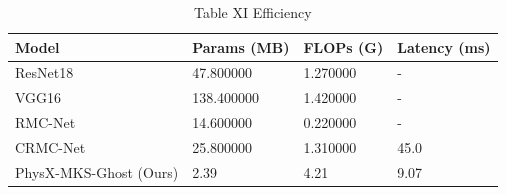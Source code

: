 \begin{table}
\caption{Table XI Efficiency}
\begin{tabular}{llll}
\toprule
Model & Params (MB) & FLOPs (G) & Latency (ms) \\
\midrule
ResNet18 & 47.800000 & 1.270000 & - \\
VGG16 & 138.400000 & 1.420000 & - \\
RMC-Net & 14.600000 & 0.220000 & - \\
CRMC-Net & 25.800000 & 1.310000 & 45.0 \\
PhysX-MKS-Ghost (Ours) & 2.39 & 4.21 & 9.07 \\
\bottomrule
\end{tabular}
\end{table}
